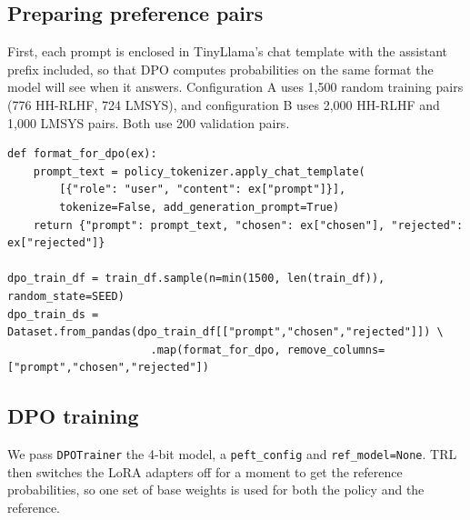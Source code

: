 \subsection{Preparing preference pairs}
First, each prompt is enclosed in TinyLlama's chat template with the assistant prefix included, so that DPO computes probabilities on the same format the model will see when it answers. Configuration A uses 1,500 random training pairs (776 HH-RLHF, 724 LMSYS), and configuration B uses 2,000 HH-RLHF and 1,000 LMSYS pairs. Both use 200 validation pairs.

\begin{lstlisting}[caption={Formatting DPO training pairs with the chat template.}, label={lst:dpofmt}]
def format_for_dpo(ex):
    prompt_text = policy_tokenizer.apply_chat_template(
        [{"role": "user", "content": ex["prompt"]}],
        tokenize=False, add_generation_prompt=True)
    return {"prompt": prompt_text, "chosen": ex["chosen"], "rejected": ex["rejected"]}

dpo_train_df = train_df.sample(n=min(1500, len(train_df)), random_state=SEED)
dpo_train_ds = Dataset.from_pandas(dpo_train_df[["prompt","chosen","rejected"]]) \
                      .map(format_for_dpo, remove_columns=["prompt","chosen","rejected"])
\end{lstlisting}

\subsection{DPO training}
We pass \texttt{DPOTrainer} the 4-bit model, a \texttt{peft\_config} and \texttt{ref\_model=None}. TRL then switches the LoRA adapters off for a moment to get the reference probabilities, so one set of base weights is used for both the policy and the reference.

